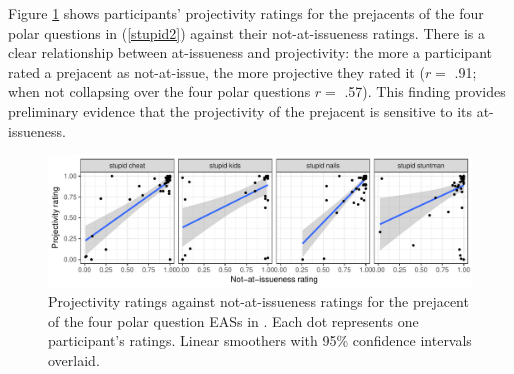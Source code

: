\documentclass[11pt,fleqn]{article}
\newcommand{\6}{\mbox{$[\hspace*{-.6mm}[$}}
\newcommand{\9}{\mbox{$]\hspace*{-.6mm}]$}}
\begin{document}
Figure \ref{f-corr} shows participants' projectivity ratings for the prejacents of the four polar questions in (\ref{stupid2}) against their not-at-issueness ratings. There is a clear relationship between at-issueness and projectivity: the more a participant rated a prejacent as not-at-issue, the more projective they rated it ($r =$ .91; when not collapsing over the four polar questions $r =$ .57). This finding provides preliminary evidence that the projectivity of the prejacent is sensitive to its at-issueness.

\begin{figure}[h!]
\centering

\includegraphics[width=1\textwidth]{figures/Exp1a-subject-projai-stupid}

\caption{Projectivity ratings against not-at-issueness ratings for the prejacent of the four polar question EASs in \citealt{tbd-variability}. Each dot represents one participant's ratings. Linear smoothers with 95\% confidence intervals overlaid.}
\label{f-corr}
\end{figure}
\end{document}

